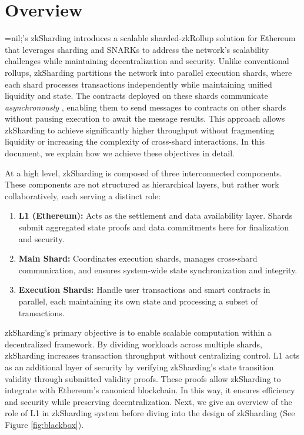 \section{Overview}
\label{sec:introduction}


=nil;’s zkSharding introduces a scalable sharded-zkRollup
solution for Ethereum that leverages
sharding and SNARKs to address the network’s scalability challenges while
maintaining decentralization and security. Unlike conventional rollups,
zkSharding partitions the network into parallel execution shards, where
each shard processes transactions independently while maintaining unified
liquidity and state. The contracts deployed on these shards communicate
\emph{asynchronously} \cite{asyncNil}, enabling them to send messages to
contracts on other shards without pausing execution to await the message
results.
This approach allows zkSharding to achieve
significantly higher throughput without fragmenting liquidity or
increasing the complexity of cross-shard interactions. In this document,
we explain how we achieve these objectives in detail.

At a high level, zkSharding is composed of three interconnected
components. These components are not structured as hierarchical layers,
but rather work collaboratively, each serving a distinct role:

\begin{enumerate}
	\item\textbf{ L1 (Ethereum):} Acts as the settlement and data
	availability layer. Shards submit aggregated state proofs and data
	commitments
	here for finalization and security.
	\item\textbf{ Main Shard:} Coordinates execution shards, manages
	cross-shard communication, and ensures system-wide state
	synchronization
	and integrity.
	\item \textbf{Execution Shards:} Handle user transactions and
	      smart contracts in parallel, each maintaining its own state
	      and processing
	      a subset of transactions.
\end{enumerate}


zkSharding’s primary objective is to enable scalable computation within a
decentralized framework. By dividing workloads across multiple shards,
zkSharding increases transaction throughput without centralizing control.
L1 acts as an additional layer of security by verifying zkSharding’s state
transition validity through submitted validity proofs. These proofs allow
zkSharding to integrate with Ethereum’s canonical blockchain. In this way,
it ensures efficiency and security while preserving decentralization.
Next, we give an overview of the role of L1 in zkSharding system before
diving into the design of zkSharding (See Figure \ref{fig:blackbox}).